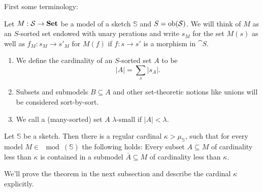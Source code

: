 First some terminology:

\begin{Definition}
Let $M : \mathcal{S} \to \mathbf{Set}$ be a model of a sketch $\mathbb S$ and $S = \textrm{ob}(\mathcal{S})$. We will think of $M$ as an $S$-sorted set endowed with unary perations and write $s_M$ for the set $M(s)$ as well as $f_M : s_M \to s'_M$ for $M(f)$ if $f : s \to s'$ is a morphism in $\cat S$.
\begin{enumerate}
\item We define the cardinality of an $S$-sorted set $A$ to be \[ |A| = \sum_s |s_A|. \]
\item Subsets and submodels $B \subseteq A$ and other set-theoretic notions like unions will be considered sort-by-sort.
\item We call a (many-sorted) set $A$ $\lambda$-small if $|A|<\lambda$.
\end{enumerate}
\end{Definition}

\begin{Theorem}\label{thm:ls}
Let $\mathbb S$ be a sketch. Then there is a regular cardinal $\kappa > \mu_{\mathbb S}$, such that for every model $M \in \mod(\mathbb S)$ the following holds: Every subset $A \subseteq M$ of cardinality less than $\kappa$ is contained in a submodel $\bar A \subseteq M$ of cardinality less than $\kappa$.
\end{Theorem}
We'll prove the theorem in the next subsection and describe the cardinal $\kappa$ explicitly. %

